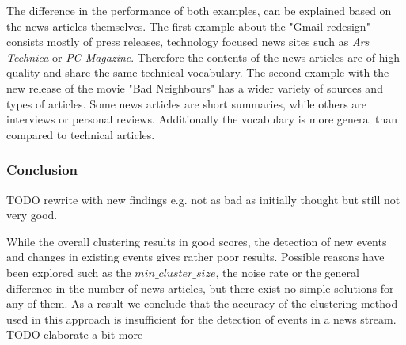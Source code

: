 The difference in the performance of both examples, can be explained based on the news articles themselves. The first example about the "Gmail redesign" consists mostly of press releases, technology focused news sites such as \textit{Ars Technica} or \textit{PC Magazine}. Therefore the contents of the news articles are of high quality and share the same technical vocabulary. The second example with the new release of the movie "Bad Neighbours" has a wider variety of sources and types of articles. Some news articles are short summaries, while others are interviews or personal reviews. Additionally the vocabulary is more general than compared to technical articles. 

\subsubsection{Conclusion}

TODO rewrite with new findings e.g. not as bad as initially thought but still not very good.

While the overall clustering results in good scores, the detection of new events and changes in existing events gives rather poor results. Possible reasons have been explored such as the $min\_cluster\_size$, the noise rate or the general difference in the number of news articles, but there exist no simple solutions for any of them. As a result we conclude that the accuracy of the clustering method used in this approach is insufficient for the detection of events in a news stream. TODO elaborate a bit more